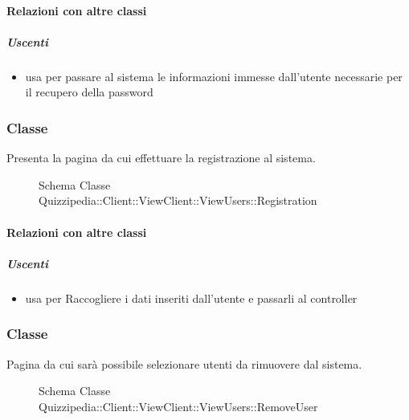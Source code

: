 \paragraph{Relazioni con altre classi}
\subparagraph{Uscenti}
\begin{itemize}
\item usa  per passare al sistema le informazioni immesse dall'utente necessarie per il recupero della password
\end{itemize}
\subsubsection{Classe }
Presenta la pagina da cui effettuare la  registrazione al sistema.
\begin{figure}[H]
\centering
\noindent{}
\caption[Schema Classe Registration]{Schema Classe Quizzipedia::Client::ViewClient::ViewUsers::Registration}
\end{figure}
\paragraph{Relazioni con altre classi}
\subparagraph{Uscenti}
\begin{itemize}
\item usa  per Raccogliere i dati inseriti dall'utente e passarli al controller
\end{itemize}
\subsubsection{Classe }
Pagina da cui sarà possibile selezionare utenti da rimuovere dal sistema.
\begin{figure}[H]
\centering
\noindent{}
\caption[Schema Classe RemoveUser]{Schema Classe Quizzipedia::Client::ViewClient::ViewUsers::RemoveUser}
\end{figure}
